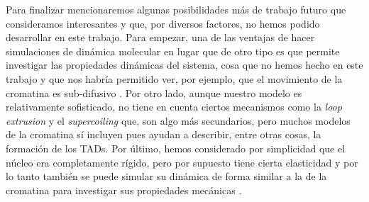 Para finalizar mencionaremos algunas posibilidades más de trabajo futuro que consideramos interesantes y que, por diversos factores, no hemos podido desarrollar en este trabajo. Para empezar, una de las ventajas de hacer simulaciones de dinámica molecular en lugar que de otro tipo es que permite investigar las propiedades dinámicas del sistema, cosa que no hemos hecho en este trabajo y que nos habría permitido ver, por ejemplo, que el movimiento de la cromatina es sub-difusivo \cite{Shi2018}. Por otro lado, aunque nuestro modelo es relativamente sofisticado, no tiene en cuenta ciertos mecanismos como la \textit{loop extrusion} y el \textit{supercoiling} que, son algo más secundarios, pero muchos modelos de la cromatina sí incluyen pues ayudan a describir, entre otras cosas, la formación de los TADs. Por último, hemos considerado por simplicidad que el núcleo era completamente rígido, pero por supuesto tiene cierta elasticidad y por lo tanto también se puede simular su dinámica de forma similar a la de la cromatina para investigar sus propiedades mecánicas \cite{Attar2024}.

